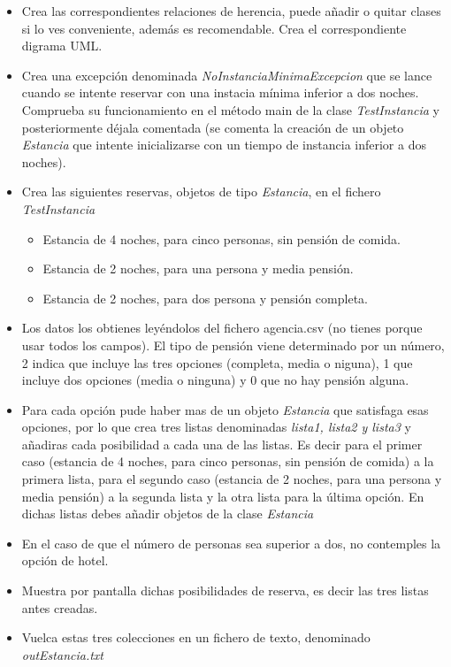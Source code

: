 \documentclass[4paper]{article}
\begin{document}
\begin{itemize}
\item Crea las correspondientes relaciones de herencia, puede añadir o quitar clases si lo ves conveniente, además es recomendable. Crea el correspondiente digrama UML.
\item Crea una excepción denominada \emph{NoInstanciaMinimaExcepcion} que se lance cuando se intente reservar con una instacia mínima inferior a dos noches. Comprueba su funcionamiento en el método main de la clase \emph{TestInstancia} y posteriormente déjala comentada (se comenta la creación de un objeto \emph{Estancia} que intente inicializarse con un tiempo de instancia inferior a dos noches).
\item Crea las siguientes reservas, objetos de tipo \emph{Estancia}, en el fichero \emph{TestInstancia}
\begin{itemize}
\item Estancia de 4 noches, para cinco personas, sin pensión de comida.
\item Estancia de 2 noches, para una persona y media pensión.
\item Estancia de 2 noches, para dos persona y pensión completa.
\end{itemize}
\item Los datos los obtienes leyéndolos del fichero agencia.csv (no tienes porque usar todos los campos). El tipo de pensión viene determinado por un número, 2 indica que incluye las tres opciones (completa, media o niguna), 1 que incluye dos opciones (media o ninguna) y 0 que no hay pensión alguna.
\item Para cada opción pude haber mas de un objeto \emph{Estancia} que satisfaga esas opciones, por lo que crea tres listas denominadas \emph{lista1, lista2 y lista3} y añadiras cada posibilidad a cada una de las listas. Es decir para el primer caso (estancia de 4 noches, para cinco personas, sin pensión de comida) a la primera lista, para el segundo caso (estancia de 2 noches, para una persona y media pensión) a la segunda lista y la otra lista para la última opción. En dichas listas debes añadir objetos de la clase \emph{Estancia}
\item En el caso de que el número de personas sea superior a dos, no contemples la opción de hotel.
\item Muestra por pantalla dichas posibilidades de reserva, es decir las tres listas antes creadas.
\item Vuelca estas tres colecciones en un fichero de texto, denominado \emph{outEstancia.txt}
\end{itemize}
\end{document}
